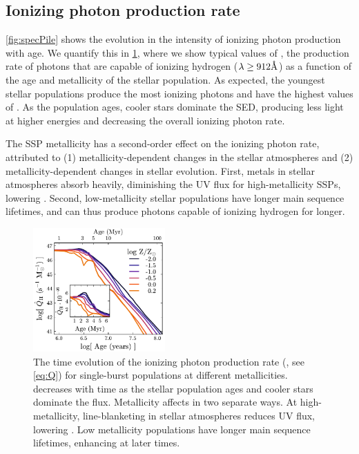 \subsection{Ionizing photon production rate}\label{sec:spectra:Q}

\ref{fig:specPile} shows the evolution in the intensity of ionizing photon production with age. We quantify this in \ref{fig:QH}, where we show typical values of \QHat{}, the production rate of photons that are capable of ionizing hydrogen ($\lambda \geq 912 \mbox{\AA}$) as a function of the age and metallicity of the stellar population. As expected, the youngest stellar populations produce the most ionizing photons and have the highest values of \QHat{}. As the population ages, cooler stars dominate the SED, producing less light at higher energies and decreasing the overall ionizing photon rate.

The SSP metallicity has a second-order effect on the ionizing photon rate, attributed to (1) metallicity-dependent changes in the stellar atmospheres and (2) metallicity-dependent changes in stellar evolution. First, metals in stellar atmospheres absorb heavily, diminishing the UV flux for high-metallicity SSPs, lowering \QHat{}. Second, low-metallicity stellar populations have longer main sequence lifetimes, and can thus produce photons capable of ionizing hydrogen for longer.

\begin{figure}[!htbp]
  \begin{centering}
    \includegraphics[width=0.45\textwidth]{manuscript/chapter2/f2.pdf}
    \caption{The time evolution of the ionizing photon production rate (\QHat{}, see \ref{eq:Q}) for single-burst populations at different metallicities. \QHat{} decreases with time as the stellar population ages and cooler stars dominate the flux. Metallicity affects \QHat{} in two separate ways. At high-metallicity, line-blanketing in stellar atmospheres reduces UV flux, lowering \QHat{}. Low metallicity populations have longer main sequence lifetimes, enhancing \QHat{} at later times.}
    \label{fig:QH}
  \end{centering}
\end{figure}

